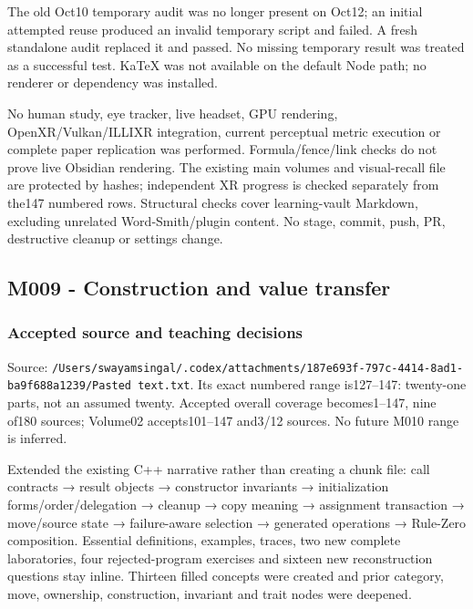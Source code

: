 The old Oct10 temporary audit was no longer present on Oct12; an initial attempted reuse produced an invalid temporary script and failed. A fresh standalone audit replaced it and passed. No missing temporary result was treated as a successful test. KaTeX was not available on the default Node path; no renderer or dependency was installed.

No human study, eye tracker, live headset, GPU rendering, OpenXR/Vulkan/ILLIXR integration, current perceptual metric execution or complete paper replication was performed. Formula/fence/link checks do not prove live Obsidian rendering. The existing main volumes and visual-recall file are protected by hashes; independent XR progress is checked separately from the147 numbered rows. Structural checks cover learning-vault Markdown, excluding unrelated Word-Smith/plugin content. No stage, commit, push, PR, destructive cleanup or settings change.

\subsection{M009 - Construction and value transfer}\label{appendix-a103e7846d21-m009---construction-and-value-transfer}

\hypertarget{appendix-a103e7846d21-m009---construction-and-value-transfer}{}

\subsubsection{Accepted source and teaching decisions}\label{appendix-a103e7846d21-accepted-source-and-teaching-decisions}

\hypertarget{appendix-a103e7846d21-accepted-source-and-teaching-decisions}{}

Source: \texttt{/Users/swayamsingal/.codex/attachments/187e693f-797c-4414-8ad1-ba9f688a1239/Pasted\ text.txt}. Its exact numbered range is127--147: twenty-one parts, not an assumed twenty. Accepted overall coverage becomes1--147, nine of180 sources; Volume02 accepts101--147 and3/12 sources. No future M010 range is inferred.

Extended the existing C++ narrative rather than creating a chunk file: call contracts → result objects → constructor invariants → initialization forms/order/delegation → cleanup → copy meaning → assignment transaction → move/source state → failure-aware selection → generated operations → Rule-Zero composition. Essential definitions, examples, traces, two new complete laboratories, four rejected-program exercises and sixteen new reconstruction questions stay inline. Thirteen filled concepts were created and prior category, move, ownership, construction, invariant and trait nodes were deepened.


